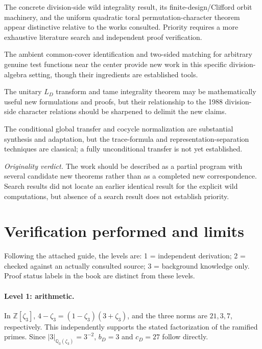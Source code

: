 \documentclass[12pt,letterpaper]{article}
\begin{document}
\begin{description}[style=nextline,leftmargin=0pt]
\item[High potential originality.] The concrete division-side wild
integrality result, its finite-design/Clifford orbit machinery, and the
uniform quadratic toral permutation-character theorem appear distinctive
relative to the works consulted. Priority requires a more exhaustive
literature search and independent proof verification.
\item[Moderate to high potential originality.] The ambient common-cover
identification and two-sided matching for arbitrary genuine test
functions near the center provide new work in this specific division-algebra
setting, though their ingredients are established tools.
\item[Moderate originality.] The unitary $L_D$ transform and tame
integrality theorem may be mathematically useful new formulations
and proofs, but their relationship to the 1988 division-side
character relations should be sharpened to delimit the new claims.
\item[More limited originality.] The conditional global transfer and
cocycle normalization are substantial synthesis and adaptation,
but the trace-formula and representation-separation techniques are
classical; a fully unconditional transfer is not yet established.
\end{description}

\noindent\emph{Originality verdict.} The work should be described as a
partial program with several candidate new theorems rather than as
a completed new correspondence. Search results did not locate an earlier
identical result for the explicit wild computations, but absence of a
search result does not establish priority.

\section{Verification performed and limits}
Following the attached guide, the levels are: 1 = independent derivation;
2 = checked against an actually consulted source; 3 = background knowledge
only. Proof status labels in the book are distinct from these levels.

\paragraph{Level 1: arithmetic.} In $\mathbb Z[\zeta_3]$,
$4-\zeta_3=(1-\zeta_3)(3+\zeta_3)$, and the three norms are $21,3,7$,
respectively. This independently supports the stated factorization of
the ramified primes. Since $|3|_{\mathbb Q_3(\zeta_3)}=3^{-2}$,
$b_D=3$ and $c_D=27$ follow directly.
\end{document}
